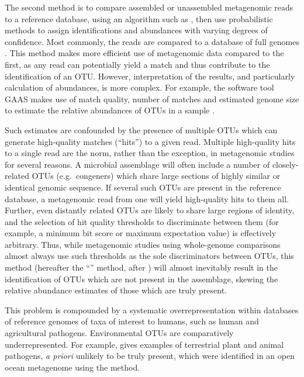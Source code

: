 The second method is to compare assembled or unassembled metagenomic reads to a reference database, using an algorithm such as , then use probabilistic methods to assign identifications and abundances with varying degrees of confidence.
Most commonly, the reads are compared to a database of full genomes \citep[e.g.][]{Lauro:2010jna,Qin:2010fl}.
This method makes more efficient use of metagenomic data compared to the first, as any read can potentially yield a  match and thus contribute to the identification of an \ac{OTU}.
However, interpretation of the results, and particularly calculation of abundances, is more complex.
For example, the software tool \ac{GAAS} makes use of  match quality, number of matches and estimated genome size to estimate the relative abundances of \acp{OTU} in a sample \cite{Angly:2009ip}.

Such estimates are confounded by the presence of multiple \acp{OTU} which can generate high-quality  matches (``hits'') to a given read.
Multiple high-quality hits to a single read are the norm, rather than the exception, in metagenomic studies for several reasons.
A microbial assemblage will often include a number of closely-related \acp{OTU} (e.g.\ congeners) which share large sections of highly similar or identical genomic sequence.
If several such \acp{OTU} are present in the reference database, a metagenomic read from one will yield high-quality  hits to them all.
Further, even distantly related \acp{OTU} are likely to share large regions of identity, and the selection of hit quality thresholds to discriminate between them (for example, a minimum bit score or maximum expectation value) is effectively arbitrary.
Thus, while metagenomic studies using whole-genome comparisons almost always use such thresholds as the sole discriminators between \acp{OTU}, this method (hereafter the ``\naive'' method, after \citet{Ye:2009bl}) will almost inevitably result in the identification of \acp{OTU} which are not present in the assemblage, skewing the relative abundance estimates of those which are truly present.



This problem is compounded by a systematic overrepresentation within databases of reference genomes of taxa of interest to humans, such as human and agricultural pathogens.
Environmental \acp{OTU} are comparatively underrepresented.
For example,  gives examples of terrestrial plant and animal pathogens, \textit{a priori} unlikely to be truly present, which were identified in an open ocean metagenome using the \naive{} method.

